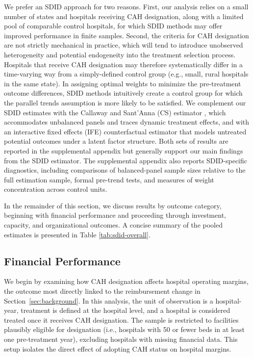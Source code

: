 \documentclass[a4paper, 12pt, twoside]{article}
\begin{document}
We prefer an SDID approach for two reasons. First, our analysis relies on a small number of states and hospitals receiving CAH designation, along with a limited pool of comparable control hospitals, for which SDID methods may offer improved performance in finite samples. Second, the criteria for CAH designation are not strictly mechanical in practice, which will tend to introduce unobserved heterogeneity and potential endogeneity into the treatment selection process. Hospitals that receive CAH designation may therefore systematically differ in a time-varying way from a simply-defined control group (e.g., small, rural hospitals in the same state). In assigning optimal weights to minimize the pre-treatment outcome differences, SDID methods intuitively create a control group for which the parallel trends assumption is more likely to be satisfied. We complement our SDID estimates with the Callaway and Sant'Anna (CS) estimator \citep{callaway2021}, which accommodates unbalanced panels and traces dynamic treatment effects, and with an interactive fixed effects (IFE) counterfactual estimator \citep{xu2017} that models untreated potential outcomes under a latent factor structure. Both sets of results are reported in the supplemental appendix but generally support our main findings from the SDID estimator. The supplemental appendix also reports SDID-specific diagnostics, including comparisons of balanced-panel sample sizes relative to the full estimation sample, formal pre-trend tests, and measures of weight concentration across control units.

In the remainder of this section, we discuss results by outcome category, beginning with financial performance and proceeding through investment, capacity, and organizational outcomes. A concise summary of the pooled estimates is presented in Table \ref{tab:sdid-overall}.

\subsection{Financial Performance}
\label{sec:financial}

We begin by examining how CAH designation affects hospital operating margins, the outcome most directly linked to the reimbursement change in Section~\ref{sec:background}. In this analysis, the unit of observation is a hospital-year, treatment is defined at the hospital level, and a hospital is considered treated once it receives CAH designation. The sample is restricted to facilities plausibly eligible for designation (i.e., hospitals with 50 or fewer beds in at least one pre-treatment year), excluding hospitals with missing financial data. This setup isolates the direct effect of adopting CAH status on hospital margins.
\end{document}
